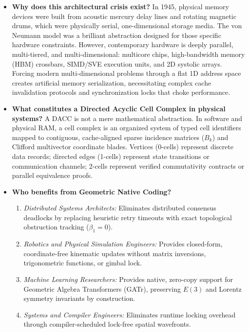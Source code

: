 \begin{itemize}[leftmargin=1.2cm]
    \item \textbf{Why does this architectural crisis exist?}  
    In 1945, physical memory devices were built from acoustic mercury delay lines and rotating magnetic drums, which were physically serial, one-dimensional storage media. The von Neumann model was a brilliant abstraction designed for those specific hardware constraints. However, contemporary hardware is deeply parallel, multi-tiered, and multi-dimensional: multicore chips, high-bandwidth memory (HBM) crossbars, SIMD/SVE execution units, and 2D systolic arrays. Forcing modern multi-dimensional problems through a flat 1D address space creates artificial memory serialization, necessitating complex cache invalidation protocols and synchronization locks that choke performance.

    \item \textbf{What constitutes a Directed Acyclic Cell Complex in physical systems?}  
    A DACC is not a mere mathematical abstraction. In software and physical RAM, a cell complex is an organized system of typed cell identifiers mapped to contiguous, cache-aligned sparse incidence matrices ($B_k$) and Clifford multivector coordinate blades. Vertices (0-cells) represent discrete data records; directed edges (1-cells) represent state transitions or communication channels; 2-cells represent verified commutativity contracts or parallel equivalence proofs.

    \item \textbf{Who benefits from Geometric Native Coding?}  
    \begin{enumerate}
        \item \textit{Distributed Systems Architects:} Eliminates distributed consensus deadlocks by replacing heuristic retry timeouts with exact topological obstruction tracking ($\beta_1 = 0$).
        \item \textit{Robotics and Physical Simulation Engineers:} Provides closed-form, coordinate-free kinematic updates without matrix inversions, trigonometric functions, or gimbal lock.
        \item \textit{Machine Learning Researchers:} Provides native, zero-copy support for Geometric Algebra Transformers (GATr), preserving $E(3)$ and Lorentz symmetry invariants by construction.
        \item \textit{Systems and Compiler Engineers:} Eliminates runtime locking overhead through compiler-scheduled lock-free spatial wavefronts.
    \end{enumerate}


\end{itemize}
